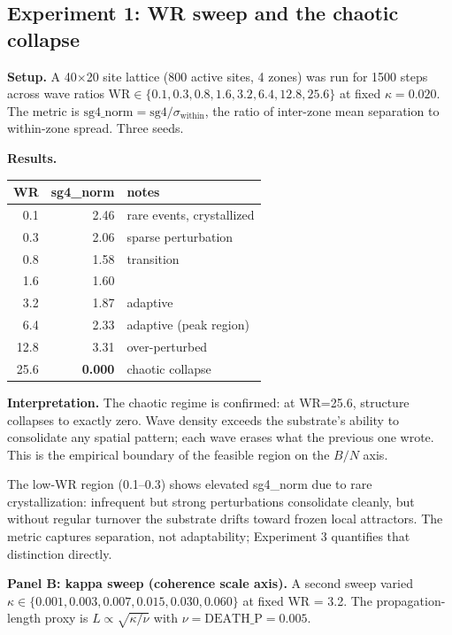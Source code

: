 \documentclass[12pt]{article}
\begin{document}
\subsection{Experiment 1: WR sweep and the chaotic collapse}
\label{sec:exp1}

\textbf{Setup.} A 40$\times$20 site lattice (800 active sites, 4 zones) was run for 1500 steps across wave ratios $\text{WR} \in \{0.1, 0.3, 0.8, 1.6, 3.2, 6.4, 12.8, 25.6\}$ at fixed $\kappa = 0.020$. The metric is $\text{sg4\_norm} = \text{sg4}/\sigma_{\text{within}}$, the ratio of inter-zone mean separation to within-zone spread. Three seeds.

\textbf{Results.}
\begin{center}
\begin{tabular}{rrl}
\toprule
WR & sg4\_norm & notes \\
\midrule
0.1  & 2.46 & rare events, crystallized \\
0.3  & 2.06 & sparse perturbation \\
0.8  & 1.58 & transition \\
1.6  & 1.60 & \\
3.2  & 1.87 & adaptive \\
6.4  & 2.33 & adaptive (peak region) \\
12.8 & 3.31 & over-perturbed \\
25.6 & \textbf{0.000} & chaotic collapse \\
\bottomrule
\end{tabular}
\end{center}

\textbf{Interpretation.} The chaotic regime is confirmed: at WR=25.6, structure collapses to exactly zero. Wave density exceeds the substrate's ability to consolidate any spatial pattern; each wave erases what the previous one wrote. This is the empirical boundary of the feasible region on the $B/N$ axis.

The low-WR region (0.1--0.3) shows elevated sg4\_norm due to rare crystallization: infrequent but strong perturbations consolidate cleanly, but without regular turnover the substrate drifts toward frozen local attractors. The metric captures separation, not adaptability; Experiment 3 quantifies that distinction directly.

\textbf{Panel B: kappa sweep (coherence scale axis).} A second sweep varied $\kappa \in \{0.001, 0.003, 0.007, 0.015, 0.030, 0.060\}$ at fixed WR = 3.2. The propagation-length proxy is $L \propto \sqrt{\kappa/\nu}$ with $\nu = \text{DEATH\_P} = 0.005$.
\end{document}
